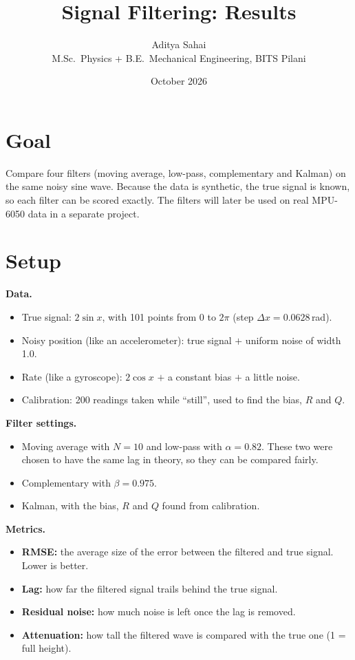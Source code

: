 \documentclass[11pt,a4paper]{article}
\title{\textbf{Signal Filtering: Results}}
\author{Aditya Sahai\\ \small M.Sc.\ Physics + B.E.\ Mechanical Engineering, BITS Pilani}
\date{October 2026}
\begin{document}
\maketitle

\section{Goal}
Compare four filters (moving average, low-pass, complementary and Kalman) on the same noisy sine wave.
Because the data is synthetic, the true signal is known, so each filter can be scored exactly.
The filters will later be used on real MPU-6050 data in a separate project.

\section{Setup}

\textbf{Data.}
\begin{itemize}
  \item True signal: $2\sin x$, with 101 points from $0$ to $2\pi$ (step $\Delta x = 0.0628$\,rad).
  \item Noisy position (like an accelerometer): true signal $+$ uniform noise of width 1.0.
  \item Rate (like a gyroscope): $2\cos x$ $+$ a constant bias $+$ a little noise.
  \item Calibration: 200 readings taken while ``still'', used to find the bias, $R$ and $Q$.
\end{itemize}

\textbf{Filter settings.}
\begin{itemize}
  \item Moving average with $N = 10$ and low-pass with $\alpha = 0.82$. These two were chosen to have the
        same lag in theory, so they can be compared fairly.
  \item Complementary with $\beta = 0.975$.
  \item Kalman, with the bias, $R$ and $Q$ found from calibration.
\end{itemize}

\textbf{Metrics.}
\begin{itemize}
  \item \textbf{RMSE:} the average size of the error between the filtered and true signal. Lower is better.
  \item \textbf{Lag:} how far the filtered signal trails behind the true signal.
  \item \textbf{Residual noise:} how much noise is left once the lag is removed.
  \item \textbf{Attenuation:} how tall the filtered wave is compared with the true one (1 = full height).
\end{itemize}
\end{document}
